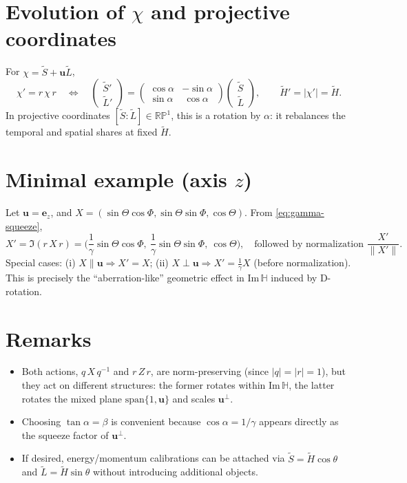 \documentclass[11pt,a4paper]{article}
\newcommand{\ImH}{\mathrm{Im}\,\mathbb{H}}
\newcommand{\uu}{\mathbf{u}}        %
\newcommand{\Sand}[2]{#1\,#2\,#1}   %
\newcommand{\Snd}[2]{#1\,#2\,#1^{-1}} %
\begin{document}
\section{Evolution of \texorpdfstring{\(\chi\)}{chi} and projective coordinates}
For \(\chi=\tilde S+\uu\tilde L\),
\begin{equation}
  \chi'=\Sand{r}{\chi} \quad\Longleftrightarrow\quad
  \begin{pmatrix}\tilde S'\\ \tilde L'\end{pmatrix}
  =
  \begin{pmatrix}
    \cos\alpha & -\sin\alpha\\
    \sin\alpha & \ \cos\alpha
  \end{pmatrix}
  \begin{pmatrix}\tilde S\\ \tilde L\end{pmatrix},\qquad
  \tilde H'=|\chi'|=\tilde H.
\end{equation}
In projective coordinates \([\tilde S:\tilde L]\in\mathbb{RP}^1\), this is a rotation by \(\alpha\):
it rebalances the temporal and spatial shares at fixed \(\tilde H\).

\section{Minimal example (axis \texorpdfstring{\(z\)}{z})}
Let \(\uu=\mathbf e_z\), and \(X=(\sin\Theta\cos\Phi,\sin\Theta\sin\Phi,\cos\Theta)\).
From \eqref{eq:gamma-squeeze},
\begin{equation}
  X'=\Im(\Sand{r}{X})
  = \Big(\frac{1}{\gamma}\sin\Theta\cos\Phi,\ \frac{1}{\gamma}\sin\Theta\sin\Phi,\ \cos\Theta\Big),
  \quad\text{followed by normalization } \frac{X'}{\|X'\|}.
\end{equation}
Special cases: (i) \(X\parallel\uu\Rightarrow X'=X\);
(ii) \(X\perp\uu\Rightarrow X'=\frac{1}{\gamma}X\) (before normalization).
This is precisely the ``aberration-like'' geometric effect in \(\ImH\) induced by D-rotation.

\section{Remarks}
\begin{itemize}
  \item Both actions, \(\Snd{q}{X}\) and \(\Sand{r}{Z}\), are norm-preserving (since \(|q|=|r|=1\)), but they act on different structures:
  the former rotates within \(\ImH\), the latter rotates the mixed plane \(\mathrm{span}\{1,\uu\}\) and scales \(\uu^\perp\).
  \item Choosing \(\tan\alpha=\beta\) is convenient because \(\cos\alpha=1/\gamma\) appears directly as the squeeze factor of \(\uu^\perp\).
  \item If desired, energy/momentum calibrations can be attached via \(\tilde S=\tilde H\cos\theta\) and \(\tilde L=\tilde H\sin\theta\) without introducing additional objects.
\end{itemize}
\end{document}
